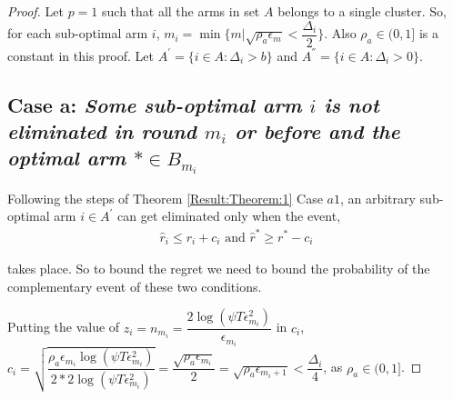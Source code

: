 \begin{proof}
Let $p=1$ such that all the arms in set $A$ belongs to a single cluster. So, for each sub-optimal arm ${i}$, $m_{i}=\min{\lbrace m|\sqrt{\rho_{a}\epsilon_{m}} < \dfrac{\Delta_{i}}{2} \rbrace}$. Also $\rho_{a}\in (0,1]$ is a constant in this proof. Let $A^{'}=\lbrace i\in A: \Delta_{i} > b \rbrace$ and $A^{''}=\lbrace i\in A: \Delta_{i} > 0 \rbrace$.


\subsection*{Case a: \textit{Some sub-optimal arm ${i}$ is not eliminated in round $m_{i}$ or before and the optimal arm ${*}\in B_{m_{i}}$}}

  
	Following the steps of Theorem \ref{Result:Theorem:1} Case $a1$, an arbitrary sub-optimal arm ${i}\in A^{'}$ can get eliminated only when the event,
	\begin{align}
	\hat{r}_{i}  \le r_{i} + c_{i} \text{ and } \label{eq:appA:armelim-casea}
 	\hat{r}^{*}\geq  r^{*} - c_{i}
	\end{align}
	
	takes place. So to bound the regret we need to bound the probability of the complementary event of these two conditions.
  
  Putting the value of $z_{i}=n_{m_{i}}=\dfrac{2\log{(\psi T\epsilon_{m_{i}}^{2})}}{\epsilon_{m_{i}}}$ in $c_{i}$,
  $c_{i}=\sqrt{\dfrac{\rho_{a}\epsilon_{m_{i}}\log (\psi T\epsilon_{m_{i}}^{2})}{2*2 \log(\psi T\epsilon_{m_{i}}^{2})}}=\dfrac{\sqrt{\rho_{a}\epsilon_{m_{i}}}}{2} = \sqrt{\rho_{a}\epsilon_{m_{i}+1}} < \dfrac{\Delta_{i}}{4} $, as $\rho_{a}\in (0,1]$.
  

\end{proof}

